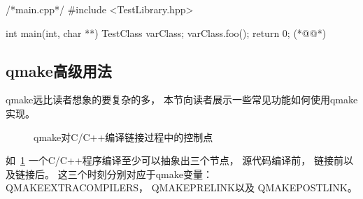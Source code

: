 \addtocounter{lstlisting}{-1}   %
\label{f000015}    %
\FloatBarrier                                  %
\begin{thebookfilesourceone}[escapeinside={(*@}{@*)},
caption=GoodLuck,
title=\filesourcenumbernameone \thefilesourcenumber
]
/*main.cpp*/
#include <TestLibrary.hpp>

int main(int, char **) {
    TestClass varClass;
    varClass.foo();
    return 0;
}(*@\marginpar[\hfill\setlength\fboxsep{2pt}\fbox{\footnotesize{\kaishu\parbox{1em}{\setlength{\baselineskip}{2pt}\filesourcenumbernameone}}\footnotesize{\thefilesourcenumber}}]{\setlength\fboxsep{2pt}\fbox{\footnotesize{\kaishu\parbox{1em}{\setlength{\baselineskip}{2pt}\filesourcenumbernameone}}\footnotesize{\thefilesourcenumber}}}@*)\end{thebookfilesourceone}          %
\addtocounter{lstlisting}{-1}   %


\FloatBarrier
\subsection{
qmake高级用法
}\label{ss000810}


qmake远比读者想象的要复杂的多，
本节向读者展示一些常见功能如何使用qmake实现。

\begin{figure}[htb] %
\marginnote{\setlength\fboxsep{2pt}\fbox{\footnotesize{\kaishu\figurename\,}\footnotesize{\ref{p000002}}}}\centering %
\setlength\fboxsep{-1pt} %
\caption{qmake对C/C{\sourcefonttwo{}+}{\sourcefonttwo{}+}编译链接过程中的控制点} %
\label{p000002} %
\end{figure}


如\figurename\ \ref{p000002}
一个C/C{\sourcefonttwo{}+}{\sourcefonttwo{}+}程序编译至少可以抽象出三个节点，
源代码编译前，
链接前以及链接后。
这三个时刻分别对应于qmake变量：
QMAKE\underline{\hspace{0.5em}}EXTRA\underline{\hspace{0.5em}}COMPILERS，
QMAKE\underline{\hspace{0.5em}}PRE\underline{\hspace{0.5em}}LINK以及
QMAKE\underline{\hspace{0.5em}}POST\underline{\hspace{0.5em}}LINK。

